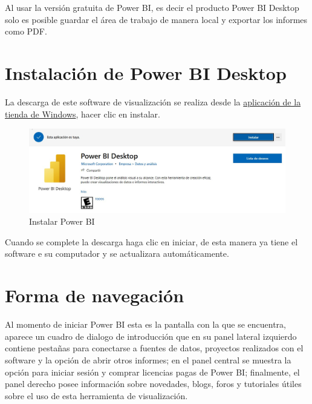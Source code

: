 \documentclass[
]{book}
\begin{document}
Al usar la versión gratuita de Power BI, es decir el producto Power BI Desktop solo es posible guardar el área de trabajo de manera local y exportar los informes como PDF.

\hypertarget{instalaciuxf3n-de-power-bi-desktop}{%
\section{Instalación de Power BI Desktop}\label{instalaciuxf3n-de-power-bi-desktop}}

La descarga de este software de visualización se realiza desde la \href{https://aka.ms/pbidesktopstore}{aplicación de la tienda de Windows}, hacer clic en instalar.

\begin{figure}

{\centering \includegraphics[width=0.6\linewidth]{Imágenes/powerbi4} 

}

\caption{Instalar Power BI}\label{fig:instalacionpowerbi-fig}
\end{figure}

Cuando se complete la descarga haga clic en iniciar, de esta manera ya tiene el software e su computador y se actualizara automáticamente.

\hypertarget{formadenavegacionpower}{%
\section{Forma de navegación}\label{formadenavegacionpower}}

Al momento de iniciar Power BI esta es la pantalla con la que se encuentra, aparece un cuadro de dialogo de introducción que en su panel lateral izquierdo contiene pestañas para conectarse a fuentes de datos, proyectos realizados con el software y la opción de abrir otros informes; en el panel central se muestra la opción para iniciar sesión y comprar licencias pagas de Power BI; finalmente, el panel derecho posee información sobre novedades, blogs, foros y tutoriales útiles sobre el uso de esta herramienta de visualización.
\end{document}
